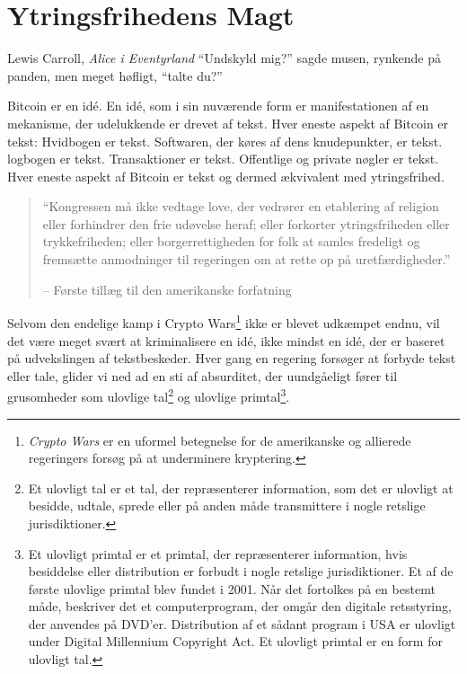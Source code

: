 
\chapter{Ytringsfrihedens Magt}
\label{les:6}

\begin{chapquote}{Lewis Carroll, \textit{Alice i Eventyrland}}
\enquote{Undskyld mig?} sagde musen, rynkende på panden, men meget høfligt, 
\enquote{talte du?}
\end{chapquote}

Bitcoin er en idé. En idé, som i sin nuværende form er manifestationen af en 
mekanisme, der udelukkende er drevet af tekst. Hver eneste aspekt af Bitcoin 
er tekst: Hvidbogen er tekst. Softwaren, der køres af dens knudepunkter, er 
tekst. logbogen er tekst. Transaktioner er tekst. Offentlige og private 
nøgler er tekst. Hver eneste aspekt af Bitcoin er tekst og dermed ækvivalent 
med ytringsfrihed.

\begin{quotation}\begin{samepage}
\enquote{Kongressen må ikke vedtage love, der vedrører en etablering af religion
eller forhindrer den frie udøvelse heraf; eller forkorter ytringsfriheden eller
trykkefriheden; eller borgerrettigheden for folk at samles fredeligt og
fremsætte anmodninger til regeringen om at rette op på uretfærdigheder.}
\begin{flushright} -- Første tillæg til den amerikanske forfatning
\end{flushright}\end{samepage}\end{quotation}

Selvom den endelige kamp i Crypto Wars\footnote{\textit{Crypto Wars} er en 
uformel betegnelse for de amerikanske og allierede regeringers forsøg på at 
underminere kryptering.\cite{eff-cryptowars}\cite{wiki:cryptowars}} ikke er 
blevet udkæmpet endnu, vil det være meget svært at kriminalisere en idé, ikke 
mindst en idé, der er baseret på udvekslingen af tekstbeskeder. Hver gang en 
regering forsøger at forbyde tekst eller tale, glider vi ned ad en sti af 
absurditet, der uundgåeligt fører til grusomheder som ulovlige tal\footnote{Et 
ulovligt tal er et tal, der repræsenterer information, som det er ulovligt at 
besidde, udtale, sprede eller på anden måde transmittere i nogle retslige 
jurisdiktioner.\cite{wiki:illegal-number}} og ulovlige primtal\footnote{Et 
ulovligt primtal er et primtal, der repræsenterer information, hvis besiddelse 
eller distribution er forbudt i nogle retslige jurisdiktioner. Et af de første 
ulovlige primtal blev fundet i 2001. Når det fortolkes på en bestemt måde, 
beskriver det et computerprogram, der omgår den digitale retsstyring, der 
anvendes på DVD'er. Distribution af et sådant program i USA er ulovligt under 
Digital Millennium Copyright Act. Et ulovligt primtal er en form for ulovligt 
tal.\cite{wiki:illegal-prime}}.

